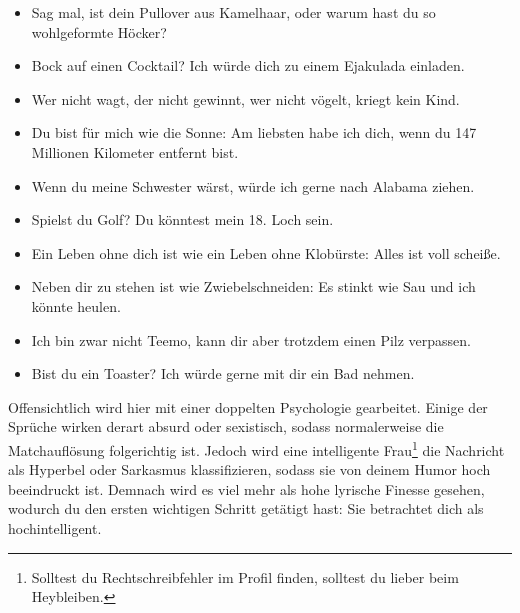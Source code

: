 \begin{itemize}
    \item Sag mal, ist dein Pullover aus Kamelhaar, oder warum hast du so wohlgeformte Höcker?
    \item Bock auf einen Cocktail? Ich würde dich zu einem Ejakulada einladen.
    \item Wer nicht wagt, der nicht gewinnt, wer nicht vögelt, kriegt kein Kind.
    \item Du bist für mich wie die Sonne: Am liebsten habe ich dich, wenn du 147 Millionen Kilometer entfernt bist.
    \item Wenn du meine Schwester wärst, würde ich gerne nach Alabama ziehen.
    \item Spielst du Golf? Du könntest mein 18. Loch sein.
    \item Ein Leben ohne dich ist wie ein Leben ohne Klobürste: Alles ist voll scheiße.
    \item Neben dir zu stehen ist wie Zwiebelschneiden: Es stinkt wie Sau und ich könnte heulen.
    \item Ich bin zwar nicht Teemo, kann dir aber trotzdem einen Pilz verpassen.
    \item Bist du ein Toaster? Ich würde gerne mit dir ein Bad nehmen.
\end{itemize}

Offensichtlich wird hier mit einer doppelten Psychologie gearbeitet.
Einige der Sprüche wirken derart absurd oder sexistisch, sodass normalerweise die Matchauflösung folgerichtig ist. 
Jedoch wird eine intelligente Frau\footnote{Solltest du Rechtschreibfehler im Profil finden, solltest du lieber beim \glqq Hey\grqq bleiben.} die Nachricht als Hyperbel oder Sarkasmus klassifizieren, sodass sie von deinem Humor hoch beeindruckt ist.
Demnach wird es viel mehr als hohe lyrische Finesse gesehen, wodurch du den ersten wichtigen Schritt getätigt hast: Sie betrachtet dich als hochintelligent.

